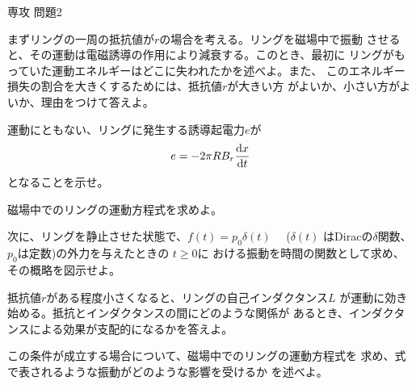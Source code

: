 \documentclass[fleqn]{jbook}
\begin{document}
\begin{question}{専攻 問題2}{}
\begin{subquestions}
\SubQuestion
  まずリングの一周の抵抗値が$r$の場合を考える。リングを磁場中で振動
  させると、その運動は電磁誘導の作用により減衰する。このとき、最初に
  リングがもっていた運動エネルギーはどこに失われたかを述べよ。また、
  このエネルギー損失の割合を大きくするためには、抵抗値$r$が大きい方
  がよいか、小さい方がよいか、理由をつけて答えよ。

\SubQuestion
  \begin{subsubquestions}
  \SubSubQuestion
    運動にともない、リングに発生する誘導起電力$e$が
%
    \[ e = -2 \pi R B_r {\frac{{\rm d} x}{{\rm d} t}} \]
%
    となることを示せ。

  \SubSubQuestion
    磁場中でのリングの運動方程式を求めよ。

  \end{subsubquestions}

\SubQuestion
  次に、リングを静止させた状態で、$f(t)=p_0\delta(t)\quad$ ($\delta(t)$
  はDiracの$\delta$関数、$p_0$は定数)の外力を与えたときの $t\geq0$に
  おける振動を時間の関数として求め、その概略を図示せよ。

\SubQuestion
  \begin{subsubquestions}
  \SubSubQuestion
    抵抗値$r$がある程度小さくなると、リングの自己インダクタンス$L$
    が運動に効き始める。抵抗とインダクタンスの間にどのような関係が
    あるとき、インダクタンスによる効果が支配的になるかを答えよ。

  \SubSubQuestion
    この条件が成立する場合について、磁場中でのリングの運動方程式を
    求め、式で表されるような振動がどのような影響を受けるか
    を述べよ。
  \end{subsubquestions}
\end{subquestions}
\end{question}
\end{document}
